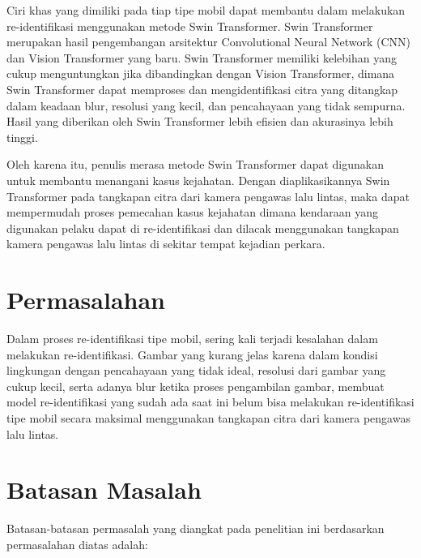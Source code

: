Ciri khas yang dimiliki pada tiap tipe mobil dapat membantu dalam melakukan \linebreak
re-identifikasi menggunakan metode Swin Transformer. Swin Transformer merupakan hasil 
pengembangan arsitektur Convolutional Neural Network (CNN) dan Vision Transformer yang 
baru. Swin Transformer memiliki kelebihan yang cukup menguntungkan jika dibandingkan 
dengan Vision Transformer, dimana Swin Transformer dapat memproses dan mengidentifikasi 
citra yang ditangkap dalam keadaan blur, resolusi yang kecil, dan pencahayaan yang tidak 
sempurna. Hasil yang diberikan oleh Swin Transformer lebih efisien dan akurasinya lebih tinggi.

Oleh karena itu, penulis merasa metode Swin Transformer dapat digunakan untuk membantu menangani 
kasus kejahatan. Dengan diaplikasikannya Swin Transformer pada tangkapan citra dari kamera pengawas 
lalu lintas, maka dapat mempermudah proses pemecahan kasus kejahatan dimana kendaraan yang digunakan 
pelaku dapat di re-identifikasi dan dilacak menggunakan tangkapan kamera pengawas lalu lintas di 
sekitar tempat kejadian perkara.

\section{Permasalahan}
\label{sec:permasalahan}

Dalam proses re-identifikasi tipe mobil, sering kali terjadi kesalahan dalam melakukan re-identifikasi.
Gambar yang kurang jelas karena dalam kondisi lingkungan dengan pencahayaan yang tidak ideal,
resolusi dari gambar yang cukup kecil, serta adanya blur ketika proses pengambilan gambar, membuat model re-identifikasi
yang sudah ada saat ini belum bisa melakukan re-identifikasi tipe mobil secara maksimal menggunakan 
tangkapan citra dari kamera pengawas lalu lintas.

\section{Batasan Masalah}
\label{sec:batasanmasalah}

Batasan-batasan permasalah yang diangkat pada penelitian ini berdasarkan permasalahan diatas adalah:

